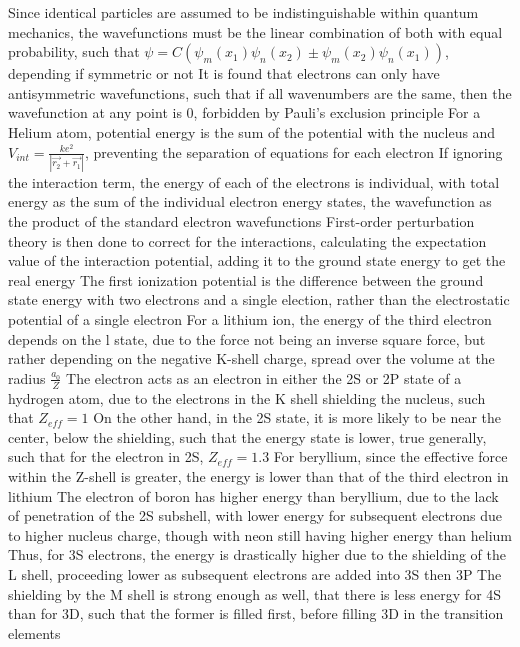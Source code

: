 \documentclass[11 pt, twoside]{article}
\newenvironment{outline*}
{
	\begin{outline}[enumerate]
	}
	{\end{outline}
}
\begin{document}
\begin{outline*}
	\2 Since identical particles are assumed to be indistinguishable within quantum mechanics, the wavefunctions must be the linear combination of both with equal probability, such that $\psi = C(\psi_m(x_1)\psi_n(x_2) \pm \psi_m(x_2)\psi_n(x_1))$, depending if symmetric or not
	\2 It is found that electrons can only have antisymmetric wavefunctions, such that if all wavenumbers are the same, then the wavefunction at any point is 0, forbidden by Pauli's exclusion principle
\1 For a Helium atom, potential energy is the sum of the potential with the nucleus and $V_{int} = \frac{ke^2}{|\vec{r_2} + \vec{r_1}|}$, preventing the separation of equations for each electron
	\2 If ignoring the interaction term, the energy of each of the electrons is individual, with total energy as the sum of the individual electron energy states, the wavefunction as the product of the standard electron wavefunctions
		\3 First-order perturbation theory is then done to correct for the interactions, calculating the expectation value of the interaction potential, adding it to the ground state energy to get the real energy
	\2 The first ionization potential is the difference between the ground state energy with two electrons and a single election, rather than the electrostatic potential of a single electron
\1 For a lithium ion, the energy of the third electron depends on the l state, due to the force not being an inverse square force, but rather depending on the negative K-shell charge, spread over the volume at the radius $\frac{a_0}{Z}$
	\2 The electron acts as an electron in either the 2S or 2P state of a hydrogen atom, due to the electrons in the K shell shielding the nucleus, such that $Z_{eff} = 1$
		\3 On the other hand, in the 2S state, it is more likely to be near the center, below the shielding, such that the energy state is lower, true generally, such that for the electron in 2S, $Z_{eff} = 1.3$
	\2 For beryllium, since the effective force within the Z-shell is greater, the energy is lower than that of the third electron in lithium
	\2 The electron of boron has higher energy than beryllium, due to the lack of penetration of the 2S subshell, with lower energy for subsequent electrons due to higher nucleus charge, though with neon still having higher energy than helium 
	\2 Thus, for 3S electrons, the energy is drastically higher due to the shielding of the L shell, proceeding lower as subsequent electrons are added into 3S then 3P
	\2 The shielding by the M shell is strong enough as well, that there is less energy for 4S than for 3D, such that the former is filled first, before filling 3D in the transition elements
\1 
\end{outline*}
\end{document}
